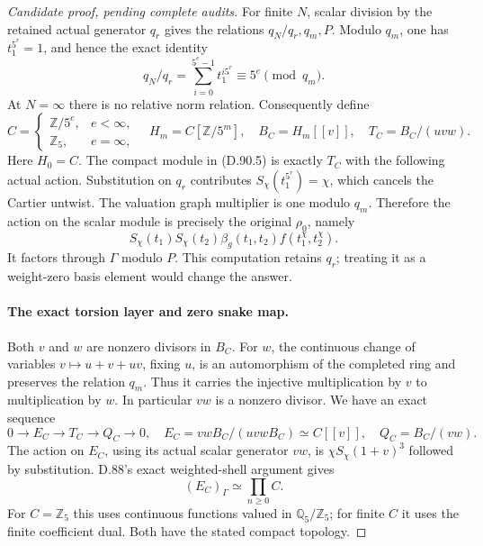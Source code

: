 \begin{proof}[Candidate proof, pending complete audits]
For finite \(N\), scalar division by the retained actual
generator \(q_r\) gives the relations
\(q_N/q_r,q_m,P\). Modulo \(q_m\), one has
\(t_1^{5^r}=1\), and hence the exact identity
\[
               q_N/q_r=\sum_{i=0}^{5^e-1}t_1^{i5^r}
                              \equiv5^e\pmod{q_m}.     \tag{D.90.6}
\]
At \(N=\infty\) there is no relative norm relation.
Consequently define
\[
 C=\begin{cases}\mathbb Z/5^e,&e<\infty,\\
                \mathbb Z_5,&e=\infty,\end{cases}
 \quad H_m=C[\mathbb Z/5^m],\quad
 B_C=H_m[[v]],\quad T_C=B_C/(uvw).                      \tag{D.90.7}
\]
Here \(H_0=C\). The compact module in (D.90.5) is
exactly \(T_C\) with the following actual action.
Substitution on \(q_r\) contributes
\(S_\chi(t_1^{5^r})=\chi\), which cancels the Cartier
untwist. The valuation graph multiplier is one modulo
\(q_m\). Therefore the action on the scalar module is
precisely the original \(\rho_0\), namely
\[
     S_\chi(t_1)S_\chi(t_2)\beta_g(t_1,t_2)
                            f(t_1^\chi,t_2^\chi).      \tag{D.90.8}
\]
It factors through \(\Gamma\) modulo \(P\).
This computation retains \(q_r\); treating it as a
weight-zero basis element would change the answer.

\paragraph{The exact torsion layer and zero snake map.}
Both \(v\) and \(w\) are nonzero divisors in \(B_C\).
For \(w\), the continuous change of variables
\(v\mapsto u+v+uv\), fixing \(u\), is an automorphism
of the completed ring and preserves the relation \(q_m\).
Thus it carries the injective multiplication by \(v\)
to multiplication by \(w\). In particular \(vw\)
is a nonzero divisor. We have an exact sequence
\[
 0\longrightarrow E_C\longrightarrow T_C\longrightarrow Q_C
                 \longrightarrow0,
 \quad E_C=vwB_C/(uvwB_C)\simeq C[[v]],
 \quad Q_C=B_C/(vw).                                    \tag{D.90.9}
\]
The action on \(E_C\), using its actual scalar generator
\(vw\), is \(\chi S_\chi(1+v)^3\) followed by
substitution. D.88's exact weighted-shell argument gives
\[
                         (E_C)_\Gamma\simeq\prod_{n\ge0}C.
                                                               \tag{D.90.10}
\]
For \(C=\mathbb Z_5\) this uses continuous functions valued
in \(\mathbb Q_5/\mathbb Z_5\); for finite \(C\) it uses
the finite coefficient dual. Both have the stated compact topology.


\end{proof}
